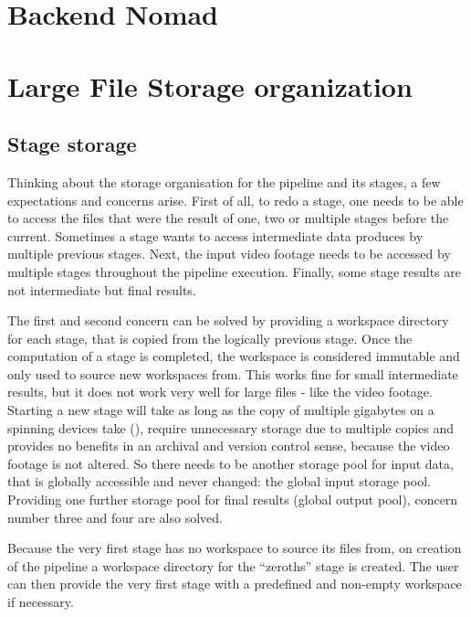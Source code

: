 \section{Backend Nomad}


\section{Large File Storage organization}

\subsection{Stage storage}


Thinking about the storage organisation for the pipeline and its stages, a few expectations and concerns arise.
First of all, to redo a stage, one needs to be able to access the files that were the result of one, two or multiple stages before the current.
Sometimes a stage wants to access intermediate data produces by multiple previous stages.
Next, the input video footage needs to be accessed by multiple stages throughout the pipeline execution.
Finally, some stage results are not intermediate but final results.

The first and second concern can be solved by providing a workspace directory for each stage, that is copied from the logically previous stage.
Once the computation of a stage is completed, the workspace is considered immutable and only used to source new workspaces from.
This works fine for small intermediate results, but it does not work very well for large files - like the video footage.
Starting a new stage will take as long as the copy of multiple gigabytes on a spinning devices take (), require unnecessary storage due to multiple copies and provides no benefits in an archival and version control sense, because the video footage is not altered.
So there needs to be another storage pool for input data, that is globally accessible and never changed: the global input storage pool.
Providing one further storage pool for final results (global output pool), concern number three and four are also solved.

Because the very first stage has no workspace to source its files from, on creation of the pipeline a workspace directory for the \enquote{zeroths} stage is created.
The user can then provide the very first stage with a predefined and non-empty workspace if necessary.

